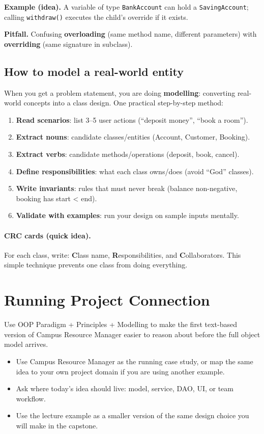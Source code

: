 \documentclass[11pt]{article}
\begin{document}
\textbf{Example (idea).} A variable of type \texttt{BankAccount} can hold a \texttt{SavingAccount}; calling \texttt{withdraw()} executes the child's override if it exists.

\textbf{Pitfall.} Confusing \textbf{overloading} (same method name, different parameters) with \textbf{overriding} (same signature in subclass).

\subsection{How to model a real-world entity}
When you get a problem statement, you are doing \textbf{modelling}: converting real-world concepts into a class design.
One practical step-by-step method:
\begin{enumerate}
  \item \textbf{Read scenarios}: list 3--5 user actions (``deposit money'', ``book a room'').
  \item \textbf{Extract nouns}: candidate classes/entities (Account, Customer, Booking).
  \item \textbf{Extract verbs}: candidate methods/operations (deposit, book, cancel).
  \item \textbf{Define responsibilities}: what each class owns/does (avoid ``God'' classes).
  \item \textbf{Write invariants}: rules that must never break (balance non-negative, booking has start < end).
  \item \textbf{Validate with examples}: run your design on sample inputs mentally.
\end{enumerate}

\paragraph{CRC cards (quick idea).} For each class, write:
\textbf{C}lass name, \textbf{R}esponsibilities, and \textbf{C}ollaborators.
This simple technique prevents one class from doing everything.

\section{Running Project Connection}
Use OOP Paradigm + Principles + Modelling to make the first text-based version of Campus Resource Manager easier to reason about before the full object model arrives.
\begin{itemize}
  \item Use Campus Resource Manager as the running case study, or map the same idea to your own project domain if you are using another example.
  \item Ask where today's idea should live: model, service, DAO, UI, or team workflow.
  \item Use the lecture example as a smaller version of the same design choice you will make in the capstone.
\end{itemize}
\notesources{\OOPSUnitISources}
\end{document}
